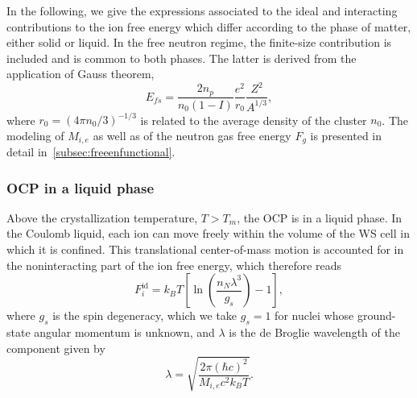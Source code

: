 In the following, we give the expressions associated to the ideal and 
interacting contributions to the ion free energy which differ according to the 
phase of matter, either solid or liquid. In the free neutron regime, the 
finite-size contribution is included and is common to both phases. The latter 
is derived from the application of Gauss theorem,
%
\begin{equation}
  E_{fs} = \frac{2n_p}{n_0(1-I)}\frac{e^2}{r_0}\frac{Z^2}{A^{1/3}},
\end{equation}
%
where $r_0=(4\pi n_0/3)^{-1/3}$ is related to the average density of the
cluster $n_0$.
The modeling of $M_{i,e}$ as well as of the neutron gas free energy $F_g$ is 
presented in detail in~\ref{subsec:freeenfunctional}. 

\subsubsection{OCP in a liquid phase}

Above the crystallization temperature, $T > T_m$, the OCP is in a liquid phase.
In the Coulomb liquid, each ion can move freely within the volume of the WS 
cell in which it is confined. This translational center-of-mass motion is
accounted for in the noninteracting part of the ion free energy, which
therefore reads~\cite{Haensel2007}
%
\begin{equation}
  F_i^{\text{id}} = k_B T 
  \left[\ln\left(\frac{n_N\lambda^3}{g_s}\right) - 1\right]\label{eq:fliqid},
\end{equation}
%
where $g_s$ is the spin degeneracy, which we take $g_s=1$ for nuclei whose
ground-state angular momentum is unknown, and $\lambda$ is the de Broglie
wavelength of the component given by
%
\begin{equation}
  \lambda = \sqrt{\frac{2\pi(\hbar c)^2}{M_{i,e}c^2 k_B T}}.
\end{equation}
%

